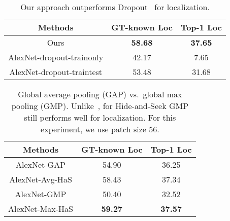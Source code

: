 \begin{table}[t!]
            \begin{center}
                \footnotesize
                \begin{tabular}{| c | c | c|}
                \hline    	
                Methods & GT-known Loc &  Top-1 Loc \\
                \hline

                Ours      &     \textbf{58.68} & \textbf{37.65}  \\
                AlexNet-dropout-trainonly            & 42.17 & 7.65  \\
                AlexNet-dropout-traintest           &  53.48  & 31.68  \\

                \hline
                 \end{tabular}
                        \caption{Our approach outperforms Dropout~\cite{srivastava-jmlr2014} for localization.}
                        \label{table:dropout_results}
                        \end{center}
                        \vspace*{-0.15in}
                        \end{table}






\begin{table}[t!]
        \begin{center}
            \footnotesize
            \begin{tabular}{| c | c | c|}
            \hline    	
            Methods & GT-known Loc &  Top-1 Loc \\
            \hline
            AlexNet-GAP            & 54.90 & 36.25 \\
            AlexNet-Avg-HaS            & 58.43 & 37.34   \\
            AlexNet-GMP            & 50.40 & 32.52  \\
            AlexNet-Max-HaS            & \textbf{59.27} &  \textbf{37.57}  \\

            \hline
             \end{tabular}
                    \caption{Global average pooling (GAP) vs.~global max pooling (GMP).  Unlike~\cite{zhou-cvpr2016}, for Hide-and-Seek GMP still performs well for localization. For this experiment, we use patch size 56.}
                    \label{table:max_results}
                    \end{center}
                    \vspace*{-0.15in}
                    \end{table}



